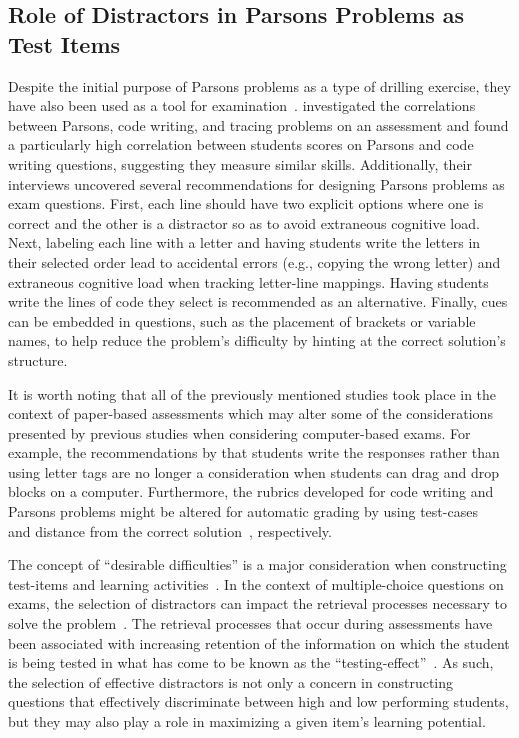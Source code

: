 \documentclass[authorversion,nonacm]{acmart}
\begin{document}
\subsection{Role of Distractors in Parsons Problems as Test Items}

Despite the initial purpose of Parsons problems as a type of drilling exercise,
they have also been used as a tool for examination~\cite{ lister2010naturally,
lopez2008relationships}.  \citet{denny2008evaluating} investigated the
correlations between Parsons, code writing, and tracing problems on an
assessment and found a particularly high correlation between students scores on
Parsons and code writing questions, suggesting they measure similar skills.
Additionally, their interviews uncovered several recommendations for designing
Parsons problems as exam questions.  First, each line should have two explicit
options where one is correct and the other is a distractor so as to avoid
extraneous cognitive load. Next, labeling each line with a letter and having
students write the letters in their selected order lead to accidental errors
(e.g., copying the wrong letter) and extraneous cognitive load  when tracking
letter-line mappings. Having students write the lines of code they select is
recommended as an alternative. Finally, cues can be embedded in questions, such
as the placement of brackets or variable names, to help reduce the problem's
difficulty by hinting at the correct solution's structure.  

It is worth noting that all of the previously mentioned studies took place
in the context of paper-based assessments which may alter some of the
considerations presented by previous studies when considering computer-based
exams. For example, the recommendations by \citet{denny2008evaluating} that
students write the responses rather than using letter tags are no longer a
consideration when students can drag and drop blocks on a computer.
Furthermore, the rubrics developed for code writing and Parsons problems might
be altered for automatic grading by using test-cases~\cite{
eddelbuettel2020r} and distance from the correct
solution~\cite{poulsen2022efficient}, respectively. 

The concept of ``desirable difficulties'' is a major consideration when
constructing test-items and learning activities~\cite{bjork2011making,
bjork2014multiple}.  In the context of multiple-choice questions on exams, the
selection of distractors can impact the retrieval processes necessary to solve
the problem~\cite{little2015optimizing}. The retrieval processes that occur 
during assessments have been associated with increasing retention of the
information on which the student is being tested in what has come to be known
as the ``testing-effect''~\cite{izawa1966reinforcement, rowland2014effect}.  As
such, the selection of effective distractors is not only a concern in
constructing questions that effectively discriminate between high and low
performing students, but they may also play a role in maximizing a given item's
learning potential.
\end{document}
